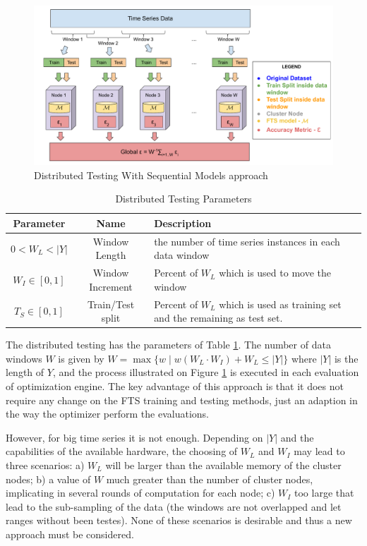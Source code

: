 \begin{figure}[htb]
    \centering
    \includegraphics[width=\textwidth]{figures/distributed_testing.pdf}
    \caption{Distributed Testing With Sequential Models approach}
    \label{fig:distributed_testing}
\end{figure}

\begin{table}[htb]
    \centering
    \begin{tabular}{|c|c|p{7cm}|} \hline
        \textbf{Parameter} & \textbf{Name} & \textbf{Description} \\ \hline
         $0 < W_L < |Y|$ & Window Length & the number of time series instances in each data window \\ \hline
         $W_I \in [0,1]$ & Window Increment & Percent of $W_L$ which is used to move the window \\ \hline
         $T_S \in [0,1]$ & Train/Test split & Percent of $W_L$ which is used as training set and the remaining as test set.  \\ \hline
    \end{tabular}
    \caption{Distributed Testing Parameters}
    \label{tab:distributed_testing}
\end{table}

The distributed testing has the parameters of Table \ref{tab:distributed_testing}. The number of data windows $W$ is given by $W = \max \{w\; |\; w(W_L\cdot W_I) + W_L \leq |Y| \}$ where $|Y|$ is the length of $Y$, and the process illustrated on Figure \ref{fig:distributed_testing} is executed in each evaluation of optimization engine. The key advantage of this approach is that it does not require any change on the FTS training and testing methods, just an adaption in the way the optimizer perform the evaluations. 

However, for big time series it is not enough. Depending on $|Y|$ and the capabilities of the available hardware, the choosing of $W_L$ and $W_I$ may lead to three scenarios: a) $W_L$ will be larger than the available memory of the cluster nodes; b) a value of $W$ much greater than the number of cluster nodes, implicating in several rounds of computation for each node; c) $W_I$ too large that lead to the sub-sampling of the data (the windows are not overlapped and let ranges without been testes). None of these scenarios is desirable and thus a new approach must be considered.

